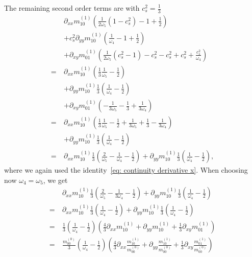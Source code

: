 The remaining second order terms are with $c_s^2=\frac{1}{3}$
\begin{align}
  \label{eq: diffusive start}
  &\partial_{xx} m_{10}^{(1)} \left(
     \frac{1}{2\omega_5} (1 - c_s^2)
     - 1
     + \frac{1}{2}
  \right)
  \\&
  \nonumber
  + c_s^2\partial_{yy} m_{10}^{(1)} \left(
    \frac{1}{\omega_4}
    - 1
    + \frac{1}{2}
  \right)
  \\&
  \nonumber
  + \partial_{xy} m_{01}^{(1)} \left(
    \frac{1}{2\omega_5} (c_s^2 - 1)
    - c_s^2
    - c_s^2
    + c_s^2
    + \frac{c_s^2}{\omega_4}
  \right)
  \\=\ &
  \nonumber
  \partial_{xx} m_{10}^{(1)} \left(
    \frac{1}{3}\frac{1}{\omega_5}
    - \frac{1}{2}
  \right)
  \\&
  \nonumber
  + \partial_{yy} m_{10}^{(1)} \frac{1}{3}\left(
    \frac{1}{\omega_4}
    - \frac{1}{2}
  \right)
  \\&
  \nonumber
  + \partial_{xy} m_{01}^{(1)} \left(
    - \frac{1}{3\omega_5}
    - \frac{1}{3}
    + \frac{1}{3\omega_4}
  \right)
  \\=\ &
  \nonumber
  \partial_{xx} m_{10}^{(1)} \left(
    \frac{1}{3}\frac{1}{\omega_5}
    - \frac{1}{2}
    + \frac{1}{3\omega_5}
    + \frac{1}{3}
    - \frac{1}{3\omega_4}
  \right)
  \\&
  \nonumber
  + \partial_{yy} m_{10}^{(1)} \frac{1}{3}\left(
    \frac{1}{\omega_4}
    - \frac{1}{2}
  \right)
  \\=\ &
  \nonumber
  \partial_{xx} m_{10}^{(1)} \frac{1}{3} \left(
    \frac{2}{\omega_5}
    - \frac{1}{\omega_4}
    - \frac{1}{2}
  \right)
  + \partial_{yy} m_{10}^{(1)} \frac{1}{3}\left(
    \frac{1}{\omega_4}
    - \frac{1}{2}
  \right),
\end{align}
where we again used the identity~\eqref{eq: continuity derivative x}.
When choosing now $\omega_4=\omega_5$, we get
\begin{align}
  \label{eq: diffusive final start}
  &\partial_{xx} m_{10}^{(1)} \frac{1}{3} \left(
    \frac{2}{\omega_5}
    - \frac{1}{3\omega_4}
    - \frac{1}{2}
  \right)
  + \partial_{yy} m_{10}^{(1)} \frac{1}{3}\left(
    \frac{1}{\omega_4}
    - \frac{1}{2}
  \right)
  \\=\
  \nonumber
  &\partial_{xx} m_{10}^{(1)} \frac{1}{3} \left(
    \frac{1}{\omega_4}
    - \frac{1}{2}
  \right)
  + \partial_{yy} m_{10}^{(1)} \frac{1}{3}\left(
    \frac{1}{\omega_4}
    - \frac{1}{2}
  \right)
  \\=\ &
  \frac{1}{3}\left(
    \frac{1}{\omega_4}
    - \frac{1}{2}
  \right) \left(\frac{4}{3}\partial_{xx} m_{10}^{(1)} + \partial_{yy} m_{10}^{(1)} + \frac{1}{3}\partial_{xy} m_{01}^{(1)}\right)
  \\=\ &
  \label{eq: diffusive final}
  \frac{m_{00}^{(0)}}{3}\left(
    \frac{1}{\omega_4}
    - \frac{1}{2}
  \right) \left(\frac{4}{3}\partial_{xx} \frac{m_{10}^{(1)}}{m_{00}^{(0)}}
  + \partial_{yy} \frac{m_{10}^{(1)}}{m_{00}^{(0)}} + \frac{1}{3}\partial_{xy} \frac{m_{01}^{(1)}}{m_{00}^{(0)}}\right)
\end{align}
